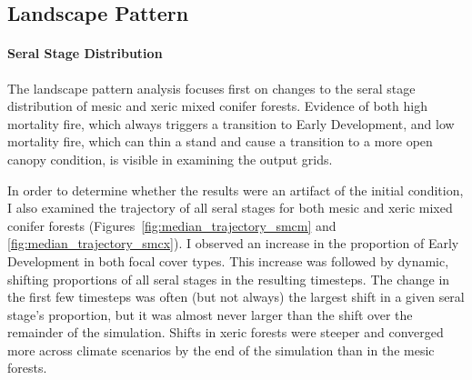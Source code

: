 \subsection{Landscape Pattern}

\paragraph*{Seral Stage Distribution}
The landscape pattern analysis focuses first on changes to the seral stage distribution of mesic and xeric mixed conifer forests. Evidence of both high mortality fire, which always triggers a transition to Early Development, and low mortality fire, which can thin a stand and cause a transition to a more open canopy condition, is visible in examining the output grids.

In order to determine whether the results were an artifact of the initial condition, I also examined the trajectory of all seral stages for both mesic and xeric mixed conifer forests (Figures~\ref{fig:median_trajectory_smcm} and \ref{fig:median_trajectory_smcx}). I observed an increase in the proportion of Early Development in both focal cover types. This increase was followed by dynamic, shifting proportions of all seral stages in the resulting timesteps. The change in the first few timesteps was often (but not always) the largest shift in a given seral stage's proportion, but it was almost never larger than the shift over the remainder of the simulation. Shifts in xeric forests were steeper and converged more across climate scenarios by the end of the simulation than in the mesic forests.


